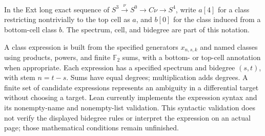 \begin{definition}
  \label{def:hopf-cofiber-cell-notation}
  \notready
  In the Ext long exact sequence of
  $S^3\xrightarrow{\nu}S^0\to C\nu\to S^4$, write $a[4]$ for a
  class restricting nontrivially to the top cell as $a$, and $b[0]$
  for the class induced from a bottom-cell class $b$. The spectrum,
  cell, and bidegree are part of this notation.
\end{definition}

\begin{definition}
  \label{def:typed-class-expression}
  \notready
  A class expression is built from the specified generators $x_{n,s,k}$
  and named classes using products, powers, and finite $\mathbb F_2$
  sums, with a bottom- or top-cell annotation when appropriate.
  Each expression has a specified spectrum and bidegree
  $(s,t)$, with stem $n=t-s$. Sums have equal degrees; multiplication
  adds degrees. A finite set of candidate expressions represents an
  ambiguity in a differential target without choosing a target.
  Lean currently implements the expression syntax and its nonempty-name
  and nonempty-list validation. This syntactic validation does not verify
  the displayed bidegree rules or interpret the expression on an actual
  page; those mathematical conditions remain unfinished.
\end{definition}

